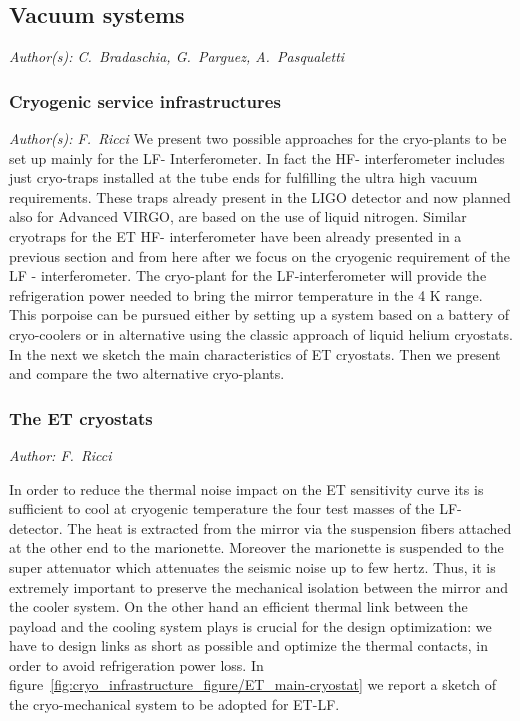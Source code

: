 \FloatBarrier
\subsection{Vacuum systems}
\emph{
Author(s): C.\ Bradaschia,  G.\ Parguez, A.\ Pasqualetti
}

\FloatBarrier
\subsubsection{Cryogenic service infrastructures}
\emph{
Author(s): F.\ Ricci
}
We present two possible approaches for the cryo-plants to be set up mainly for the LF- Interferometer.
In fact the HF- interferometer includes just cryo-traps installed at the tube ends for fulfilling  the ultra high vacuum requirements. These traps already present in the LIGO detector and now planned also for  Advanced VIRGO,  are based on the use of liquid nitrogen. Similar cryotraps for the ET HF- interferometer have been already presented  in a previous section and from here after  we focus  on the cryogenic requirement of  the LF - interferometer.
The cryo-plant for the LF-interferometer  will provide  the refrigeration power needed to bring the mirror temperature  in the 4 K range. This porpoise can be pursued either by setting up a system based on a battery of cryo-coolers or in alternative using the classic approach of   liquid helium cryostats. In the next we sketch the main characteristics of  ET cryostats. Then we  present and compare the two alternative cryo-plants.


\subsubsection{The ET  cryostats}
\emph{Author: F.\ Ricci}

In order to reduce the thermal noise impact on the ET sensitivity curve its is sufficient  to cool at cryogenic temperature the four  test masses of the LF- detector. The heat is extracted from the mirror via the suspension fibers attached at the other end to the marionette.  Moreover  the marionette is suspended to the super attenuator which attenuates the seismic noise up to few hertz. Thus,  it is extremely important to preserve the mechanical isolation between the mirror and the cooler system. On the other hand   an efficient  thermal link between
the payload and the cooling system plays is crucial for  the design optimization: we have to 
design  links as short as possible and optimize the  thermal contacts,  in order to avoid 
refrigeration power loss. 
In figure~\ref{fig:cryo_infrastructure_figure/ET_main-cryostat} we report a sketch of the cryo-mechanical system to be adopted for ET-LF.


